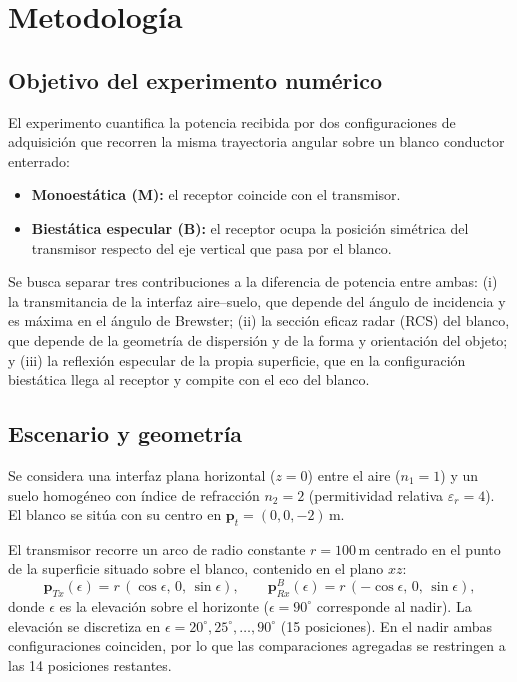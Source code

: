 \documentclass[11pt,a4paper]{report}
\newcommand{\vect}[1]{\bm{#1}}
\begin{document}
\chapter{Metodología}
\label{cap:metodologia}

\section{Objetivo del experimento numérico}

El experimento cuantifica la potencia recibida por dos configuraciones de
adquisición que recorren la misma trayectoria angular sobre un blanco
conductor enterrado:

\begin{itemize}[itemsep=2pt]
  \item \textbf{Monoestática (M):} el receptor coincide con el transmisor.
  \item \textbf{Biestática especular (B):} el receptor ocupa la posición
  simétrica del transmisor respecto del eje vertical que pasa por el blanco.
\end{itemize}

Se busca separar tres contribuciones a la diferencia de potencia entre ambas:
(i) la transmitancia de la interfaz aire--suelo, que depende del ángulo de
incidencia y es máxima en el ángulo de Brewster; (ii) la sección eficaz
radar (RCS) del blanco, que depende de la geometría de dispersión y de la
forma y orientación del objeto; y (iii) la reflexión especular de la propia
superficie, que en la configuración biestática llega al receptor y compite
con el eco del blanco.

\section{Escenario y geometría}
\label{sec:escenario}

Se considera una interfaz plana horizontal ($z=0$) entre el aire ($n_1=1$) y
un suelo homogéneo con índice de refracción $n_2=2$ (permitividad relativa
$\varepsilon_r=4$). El blanco se sitúa con su centro en
$\vect{p}_t=(0,0,-2)\,\mathrm{m}$.

El transmisor recorre un arco de radio constante $r=100\,\mathrm{m}$
centrado en el punto de la superficie situado sobre el blanco, contenido en
el plano $xz$:
\begin{equation}
  \vect{p}_{Tx}(\epsilon) = r\,(\cos\epsilon,\,0,\,\sin\epsilon),
  \qquad
  \vect{p}_{Rx}^{B}(\epsilon) = r\,(-\cos\epsilon,\,0,\,\sin\epsilon),
  \label{eq:geometria}
\end{equation}
donde $\epsilon$ es la elevación sobre el horizonte ($\epsilon=90^\circ$
corresponde al nadir). La elevación se discretiza en
$\epsilon=20^\circ,25^\circ,\dots,90^\circ$ (15 posiciones). En el nadir
ambas configuraciones coinciden, por lo que las comparaciones agregadas se
restringen a las 14 posiciones restantes.
\end{document}
